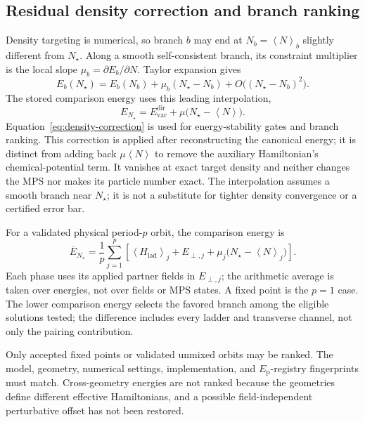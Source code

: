 \documentclass[11pt]{article}
\newcommand{\Hlad}{H_{\mathrm{lad}}}
\newcommand{\Ep}{E_{\mathrm p}}
\newcommand{\mean}[1]{\left\langle #1\right\rangle}
\begin{document}
\subsection{Residual density correction and branch ranking}

Density targeting is numerical, so branch \(b\) may end at
\(N_b=\mean N_b\) slightly different from \(N_\star\).  Along a smooth
self-consistent branch, its constraint multiplier is the local slope
\(\mu_b=\partial E_b/\partial N\).  Taylor expansion gives
\begin{equation}
 E_b(N_\star)
 =E_b(N_b)+\mu_b(N_\star-N_b)
   +O\bigl((N_\star-N_b)^2\bigr).
\end{equation}
The stored comparison energy uses this leading interpolation,
\begin{equation}
 E_{N_\star}=E_{\mathrm{var}}^{\mathrm{dir}}
              +\mu\bigl(N_\star-\mean N\bigr).
\label{eq:density-correction}
\end{equation}
Equation~\eqref{eq:density-correction} is used for energy-stability gates and
branch ranking.  This correction is applied after reconstructing the canonical
energy; it is distinct from adding back \(\mu\mean N\) to remove the
auxiliary Hamiltonian's chemical-potential term.  It vanishes at exact target
density and neither changes the MPS nor makes its particle number exact.
The interpolation assumes a smooth branch near \(N_\star\); it is not a
substitute for tighter density convergence or a certified error bar.

For a validated physical period-\(p\) orbit, the comparison energy is
\begin{equation}
 \overline E_{N_\star}
 =\frac1p\sum_{j=1}^{p}
 \left[\mean{\Hlad}_j+E_{\perp,j}
       +\mu_j\bigl(N_\star-\mean N_j\bigr)\right].
\end{equation}
Each phase uses its applied partner fields in \(E_{\perp,j}\); the arithmetic
average is taken over energies, not over fields or MPS states.  A fixed point
is the \(p=1\) case.  The lower comparison energy selects the favored branch
among the eligible solutions tested; the difference includes every ladder
and transverse channel, not only the pairing contribution.

Only accepted fixed points or validated unmixed orbits may be ranked.  The
model, geometry, numerical settings, implementation, and \(\Ep\)-registry
fingerprints must match.  Cross-geometry energies are not ranked because the
geometries define different effective Hamiltonians, and a possible
field-independent perturbative offset has not been restored.
\end{document}
